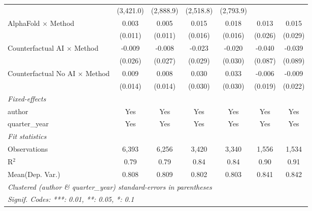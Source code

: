 \begin{tabular}{lcccccc}
                                         & (3,421.0)      & (2,888.9)      & (2,518.8)     & (2,793.9)     &                &   \\   
   AlphaFold $\times$ Method             & 0.003          & 0.005          & 0.015         & 0.018         & 0.013          & 0.015\\   
                                         & (0.011)        & (0.011)        & (0.016)       & (0.016)       & (0.026)        & (0.029)\\   
   Counterfactual AI $\times$ Method     & -0.009         & -0.008         & -0.023        & -0.020        & -0.040         & -0.039\\   
                                         & (0.026)        & (0.027)        & (0.029)       & (0.030)       & (0.087)        & (0.089)\\   
   Counterfactual No AI $\times$ Method  & 0.009          & 0.008          & 0.030         & 0.033         & -0.006         & -0.009\\   
                                         & (0.014)        & (0.014)        & (0.030)       & (0.030)       & (0.019)        & (0.022)\\   
   \midrule
   \emph{Fixed-effects}\\
   author                                & Yes            & Yes            & Yes           & Yes           & Yes            & Yes\\  
   quarter\_year                         & Yes            & Yes            & Yes           & Yes           & Yes            & Yes\\  
   \midrule
   \emph{Fit statistics}\\
   Observations                          & 6,393          & 6,256          & 3,420         & 3,340         & 1,556          & 1,534\\  
   R$^2$                                 & 0.79           & 0.79           & 0.84          & 0.84          & 0.90           & 0.91\\  
Mean(Dep. Var.) & 0.808 & 0.809 & 0.802 & 0.803 & 0.841 & 0.842 \\
   \midrule \midrule
   \multicolumn{7}{l}{\emph{Clustered (author \& quarter\_year) standard-errors in parentheses}}\\
   \multicolumn{7}{l}{\emph{Signif. Codes: ***: 0.01, **: 0.05, *: 0.1}}\\
\end{tabular}
\par\endgroup
